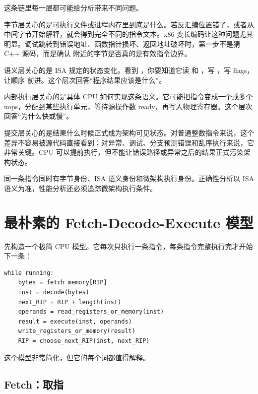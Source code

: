 这条链里每一层都可能给分析带来不同问题。

字节层关心的是可执行文件或进程内存里到底是什么。若反汇编位置错了，或者从中间字节开始解释，就会得到完全不同的指令文本。x86 变长编码让这种问题尤其明显。调试跳转到错误地址、函数指针损坏、返回地址破坏时，第一步不是猜 C++ 源码，而是确认  附近的字节是否真的是有效指令边界。

语义层关心的是 ISA 规定的状态变化。看到 ，你要知道它读  和 ，写 ，写 flags，让顺序  前进。这个层次回答“程序结果应该是什么”。

内部执行层关心的是具体 CPU 如何实现这条语义。它可能把指令变成一个或多个 uops，分配到某些执行单元，等待源操作数 ready，再写入物理寄存器。这个层次回答“为什么快或慢”。

提交层关心的是结果什么时候正式成为架构可见状态。对普通整数指令来说，这个差异不容易被源代码直接看到；对异常、调试、分支预测错误和乱序执行来说，它非常关键。CPU 可以提前执行，但不能让错误路径或异常之后的结果正式污染架构状态。

\begin{keyidea}
同一条指令同时有字节身份、ISA 语义身份和微架构执行身份。正确性分析以 ISA 语义为准，性能分析还必须追踪微架构执行条件。
\end{keyidea}

\section{最朴素的 Fetch-Decode-Execute 模型}

先构造一个极简 CPU 模型。它每次只执行一条指令，每条指令完整执行完才开始下一条：

\begin{center}
\begin{minipage}{0.78\linewidth}
\begin{verbatim}
while running:
    bytes = fetch memory[RIP]
    inst = decode(bytes)
    next_RIP = RIP + length(inst)
    operands = read_registers_or_memory(inst)
    result = execute(inst, operands)
    write_registers_or_memory(result)
    RIP = choose_next_RIP(inst, next_RIP)
\end{verbatim}
\end{minipage}
\end{center}

这个模型非常简化，但它的每个词都值得解释。

\subsection{Fetch：取指}

